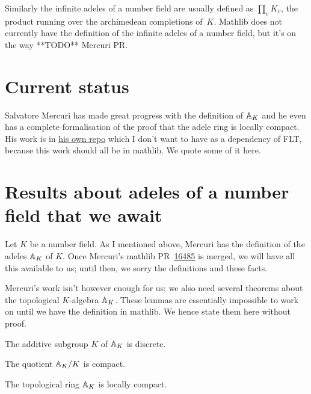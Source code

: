 Similarly the infinite adeles of a number field
are usually defined as $\prod_v K_v$,
the product running over the archimedean completions of~$K$. Mathlib does not
currently have the definition of the infinite adeles of a number field, but it's
on the way **TODO** Mercuri PR.

\section{Current status}

Salvatore Mercuri has made great progress with the definition of $\mathbb{A}_K$ and he even
has a complete formalisation of the proof that the adele ring is locally compact. His work is in
\href{https://github.com/smmercuri/adele-ring_locally-compact}{his own repo} which
I don't want to have as a dependency of FLT, because this work should all be
in mathlib. We quote some of it here.

\section{Results about adeles of a number field that we await}

Let $K$ be a number field. As I mentioned above, Mercuri has the definition of
the adeles $\mathbb{A}_K$ of $K$. Once Mercuri's mathlib
PR~\href{https://github.com/leanprover-community/mathlib4/pull/16485}{16485} is merged, we will have
all this available to us; until then, we sorry the definitions and these facts.

Mercuri's work isn't however enough for us; we also need several theorems about the
topological $K$-algebra $\mathbb{A}_K$. These lemmas are essentially impossible to work on until we have
the definition in mathlib. We hence state them here without proof.

\begin{theorem}
  \label{NumberField.AdeleRing.discrete}
  The additive subgroup $K$ of $\mathbb{A}_K$ is discrete.
\end{theorem}

\begin{theorem}
  \label{NumberField.AdeleRing.cocompact}
  The quotient $\mathbb{A}_K/K$ is compact.
\end{theorem}

\begin{theorem}
  \label{NumberField.AdeleRing.locallyCompact}
  The topological ring $\mathbb{A}_K$ is locally compact.
\end{theorem}

